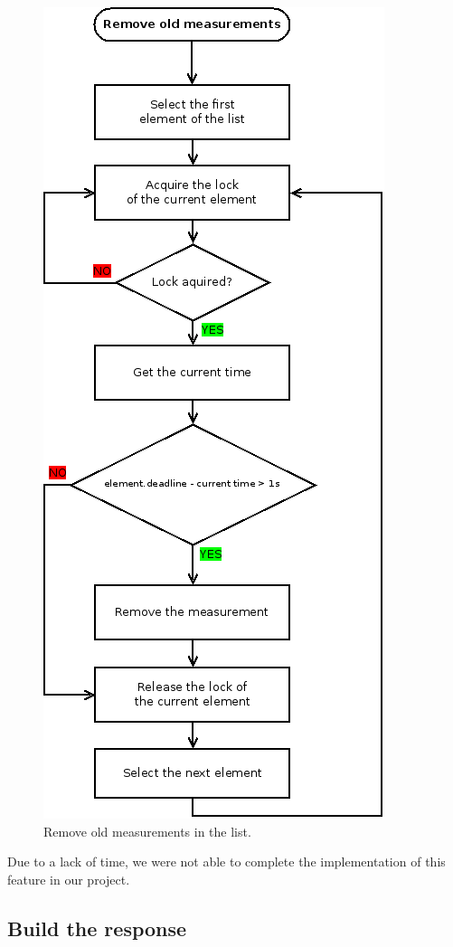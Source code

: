 \begin{figure}[H]
  \centering
  \includegraphics[scale=.7]{./ap/ap_list_thread.png}
  \caption{Remove old measurements in the list.}
\end{figure}

Due to a lack of time, we were not able to complete the implementation of this
feature in our project.

\subsection{Build the response}

